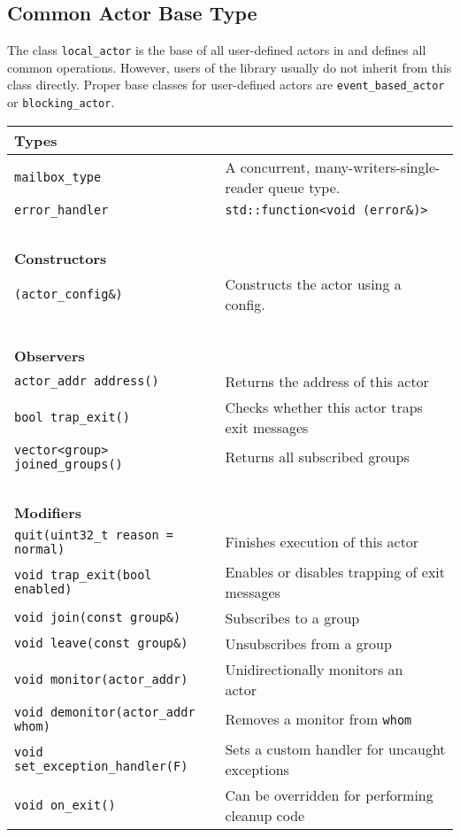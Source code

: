 \clearpage
\subsection{Common Actor Base Type}

The class \lstinline^local_actor^ is the base of all user-defined actors in \lib and defines all common operations.
However, users of the library usually do not inherit from this class directly. Proper base classes for user-defined actors are \lstinline^event_based_actor^ or \lstinline^blocking_actor^.

{\small
\begin{tabular}{ll}
  \textbf{Types} & ~ \\
  \hline
  \lstinline^mailbox_type^ & A concurrent, many-writers-single-reader queue type. \\
  \hline
  \lstinline^error_handler^ & \lstinline^std::function<void (error&)>^ \\
  \hline
  ~ & ~ \\ \textbf{Constructors} & ~ \\
  \hline
  \lstinline^(actor_config&)^ & Constructs the actor using a config. \\
  \hline
  ~ & ~ \\ \textbf{Observers} & ~ \\
  \hline
  \lstinline^actor_addr address()^ & Returns the address of this actor \\
  \hline
  \lstinline^bool trap_exit()^ & Checks whether this actor traps exit messages \\
  \hline
  \lstinline^vector<group> joined_groups()^ & Returns all subscribed groups \\
  \hline
  ~ & ~ \\ \textbf{Modifiers} & ~ \\
  \hline
  \lstinline^quit(uint32_t reason = normal)^ & Finishes execution of this actor \\
  \hline
  \lstinline^void trap_exit(bool enabled)^ & Enables or disables trapping of exit messages \\
  \hline
  \lstinline^void join(const group&)^ & Subscribes to a group\\
  \hline
  \lstinline^void leave(const group&)^ & Unsubscribes from a group \\
  \hline
  \lstinline^void monitor(actor_addr)^ & Unidirectionally monitors an actor~ \\
  \hline
  \lstinline^void demonitor(actor_addr whom)^ & Removes a monitor from \lstinline^whom^ \\
  \hline
  \lstinline^void set_exception_handler(F)^ & Sets a custom handler for uncaught exceptions \\
  \hline
  \lstinline^void on_exit()^ & Can be overridden for performing cleanup code \\
  \hline
\end{tabular}
}
\clearpage

